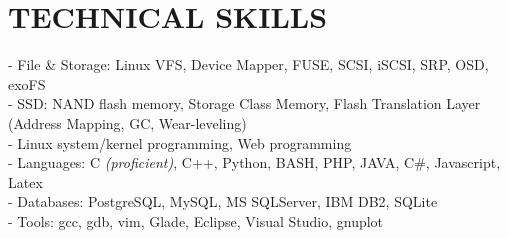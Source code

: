 \section{TECHNICAL SKILLS}
\vspace{0.07in}
- File \& Storage: Linux VFS, Device Mapper, FUSE, SCSI, iSCSI, SRP, OSD,
exoFS
\vspace{0.02in}\\
- SSD: NAND flash memory, Storage Class Memory, Flash Translation Layer (Address
Mapping, GC, Wear-leveling)
\vspace{0.02in}\\
- Linux system/kernel programming, Web programming
\vspace{0.02in}\\
- Languages: C {\footnotesize \it (proficient)}, C++, Python, BASH, PHP, JAVA, C\#,
	Javascript, Latex
\vspace{0.02in}\\
- Databases: PostgreSQL, MySQL, MS SQLServer, IBM DB2, SQLite
\vspace{0.02in}\\
- Tools: gcc, gdb, vim, Glade, Eclipse, Visual Studio, gnuplot

